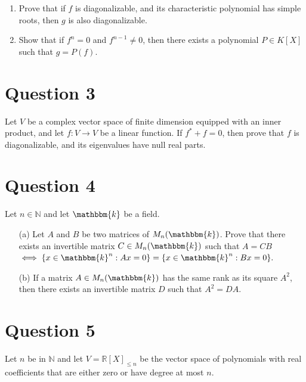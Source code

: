 \documentclass[12pt]{article}
\begin{document}
	\begin{enumerate}
		\item Prove that if \(f\) is diagonalizable, and its characteristic polynomial has simple roots, then \(g\) is also diagonalizable.
		\item Show that if \(f^n = 0\) and \(f^{n-1} \neq 0\), then there exists a polynomial \(P \in K[X]\) such that \(g = P(f)\).
	\end{enumerate}
	
	\vspace{1cm}
	
	\section{Question 3}\label{sec:q3}
	Let \(V\) be a complex vector space of finite dimension equipped with an inner product, and let \(f: V \rightarrow V\) be a linear function. If \(f^* + f = 0\), then prove that \(f\) is diagonalizable, and its eigenvalues have null real parts.
	
	\vspace{1cm}
	
\section{Question 4}\label{sec:q4}
Let \(n \in \mathbb{N}\) and let \(\mathbbm{k}\) be a field.

\begin{enumerate}
	\item[(a)] Let \(A\) and \(B\) be two matrices of \(M_n(\mathbbm{k})\). Prove that there exists an invertible matrix \(C \in M_n(\mathbbm{k})\) such that \(A = CB\) \(\iff \{ x \in \mathbbm{k}^n : Ax = 0 \} = \{ x \in \mathbbm{k}^n : Bx = 0 \}.\)
	\item[(b)] If a matrix \(A \in M_n(\mathbbm{k})\) has the same rank as its square \(A^2\), then there exists an invertible matrix \(D\) such that \(A^2 = DA\).
\end{enumerate}


		\vspace{4cm}
		\section{Question 5}\label{sec:q5}
		Let \(n\) be in \(\mathbb{N}\) and let \(V = \mathbb{R}[X]_{\leq n}\) be the vector space of polynomials with real coefficients that are either zero or have degree at most \(n\).
		
\end{document}
